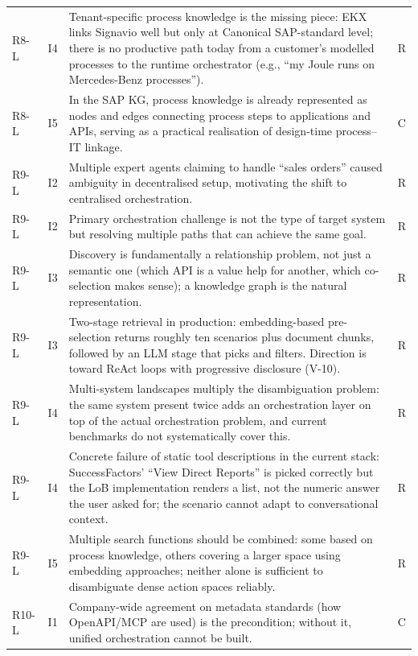 \begin{longtable}{@{} p{0.9cm} p{0.7cm} p{13.8cm} p{0.7cm} @{}}
R8-L & I4 & Tenant-specific process knowledge is the missing piece: EKX links Signavio well but only at Canonical SAP-standard level; there is no productive path today from a customer's modelled processes to the runtime orchestrator (e.g., ``my Joule runs on Mercedes-Benz processes''). & R \\
R8-L & I5 & In the SAP KG, process knowledge is already represented as nodes and edges connecting process steps to applications and APIs, serving as a practical realisation of design-time process--IT linkage. & C \\
\midrule
R9-L & I2 & Multiple expert agents claiming to handle ``sales orders'' caused ambiguity in decentralised setup, motivating the shift to centralised orchestration. & R \\
R9-L & I2 & Primary orchestration challenge is not the type of target system but resolving multiple paths that can achieve the same goal. & R \\
R9-L & I3 & Discovery is fundamentally a relationship problem, not just a semantic one (which API is a value help for another, which co-selection makes sense); a knowledge graph is the natural representation. & R \\
R9-L & I3 & Two-stage retrieval in production: embedding-based pre-selection returns roughly ten scenarios plus document chunks, followed by an LLM stage that picks and filters. Direction is toward ReAct loops with progressive disclosure (V-10). & R \\
R9-L & I4 & Multi-system landscapes multiply the disambiguation problem: the same system present twice adds an orchestration layer on top of the actual orchestration problem, and current benchmarks do not systematically cover this. & R \\
R9-L & I4 & Concrete failure of static tool descriptions in the current stack: SuccessFactors' ``View Direct Reports'' is picked correctly but the LoB implementation renders a list, not the numeric answer the user asked for; the scenario cannot adapt to conversational context. & R \\
R9-L & I5 & Multiple search functions should be combined: some based on process knowledge, others covering a larger space using embedding approaches; neither alone is sufficient to disambiguate dense action spaces reliably. & R \\
\midrule
R10-L & I1 & Company-wide agreement on metadata standards (how OpenAPI/MCP are used) is the precondition; without it, unified orchestration cannot be built. & C \\

\end{longtable}

